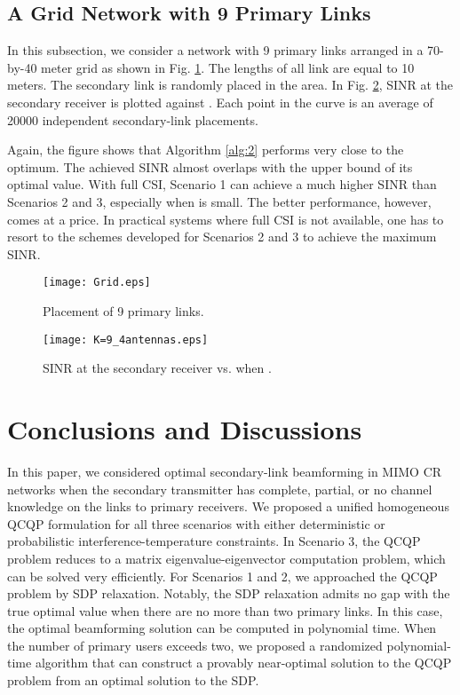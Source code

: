 \documentclass[twocolumn,10pt]{IEEEtran}
\theoremstyle{plain} \newtheorem{theorem}{Theorem}
\theoremstyle{plain} \newtheorem{proposition}{Proposition}
\theoremstyle{plain} \newtheorem{corollary}{Corollary}
\theoremstyle{remark} \newtheorem{remark}{Remark}
\theoremstyle{remark} \newtheorem{lemma}{Lemma}
\theoremstyle{plain} \newtheorem{definition}{Definition}
\theoremstyle{plain} \newtheorem{assumption}{Assumption}
\theoremstyle{plain} \newtheorem{fact}{Fact}
\begin{document}
\subsection{A Grid Network with 9 Primary Links}
In this subsection, we consider a network with 9 primary links arranged in a 70-by-40 meter grid as shown in Fig. \ref{fig:grid}. The lengths of all link are equal to 10 meters. The secondary link is randomly placed in the area. In Fig. \ref{fig:K9SINR}, SINR at the secondary receiver is plotted against . Each point in the curve is an average of 20000 independent secondary-link placements.

Again, the figure shows that Algorithm \ref{alg:2} performs very close to the optimum. The achieved SINR almost overlaps with the upper bound of its optimal value. With full CSI, Scenario 1 can achieve a much higher SINR than Scenarios 2 and 3, especially when  is small. The better performance, however, comes at a price. In practical systems where full CSI is not available, one has to resort to the schemes developed for Scenarios 2 and 3 to achieve the maximum SINR.

\begin{figure}[!ht]
\centering
\texttt{[image: Grid.eps]}
\caption{Placement of 9 primary links.}\label{fig:grid}
\end{figure}

\begin{figure}[!ht]
\centering
\texttt{[image: K=9\_4antennas.eps]}
\caption{SINR at the secondary receiver vs.  when .}\label{fig:K9SINR}
\end{figure}

\section{Conclusions and Discussions}\label{section:conclusions}
In this paper, we considered optimal secondary-link beamforming in MIMO CR networks when the secondary transmitter has complete, partial, or no channel knowledge on the links to primary receivers. We proposed a unified homogeneous QCQP formulation for all three scenarios with either deterministic or probabilistic interference-temperature constraints. In Scenario 3, the QCQP problem reduces to a matrix eigenvalue-eigenvector computation problem, which can be solved very efficiently. For Scenarios 1 and 2, we approached the QCQP problem by SDP relaxation. Notably, the SDP relaxation admits no gap with the true optimal value when there are no more than two primary links. In this case, the optimal beamforming solution can be computed in polynomial time. When the number of primary users exceeds two, we proposed a randomized polynomial-time algorithm that can construct a provably near-optimal solution to the QCQP problem from an optimal solution to the SDP.
\end{document}
